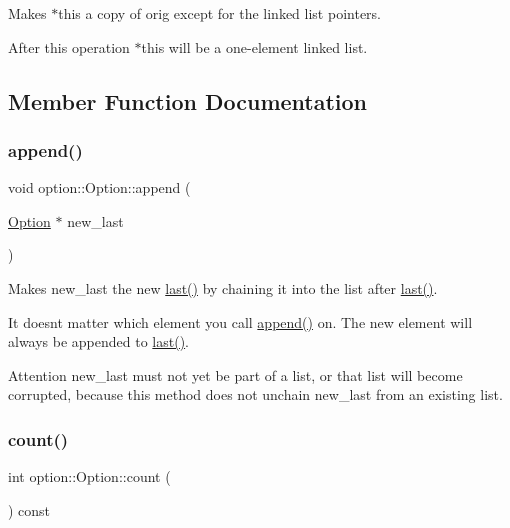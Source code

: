 Makes {\ttfamily $\ast$this} a copy of {\ttfamily orig} except for the linked list pointers. 

After this operation {\ttfamily $\ast$this} will be a one-\/element linked list. 

\subsection{Member Function Documentation}
\mbox{\label{classoption_1_1_option_a59030822a1ec4e667e6c288d7e5ec961}} 
\subsubsection{\texorpdfstring{append()}{append()}}
{\footnotesize\ttfamily void option\+::\+Option\+::append (\begin{DoxyParamCaption}\item[{\hyperlink{classoption_1_1_option}{Option} $\ast$}]{new\+\_\+last }\end{DoxyParamCaption})\hspace{0.3cm}{\ttfamily [inline]}}



Makes {\ttfamily new\+\_\+last} the new \hyperlink{classoption_1_1_option_afe2aff68191e55b59c53fac3dbbcd7c3}{last()} by chaining it into the list after \hyperlink{classoption_1_1_option_afe2aff68191e55b59c53fac3dbbcd7c3}{last()}. 

It doesn\textquotesingle{}t matter which element you call \hyperlink{classoption_1_1_option_a59030822a1ec4e667e6c288d7e5ec961}{append()} on. The new element will always be appended to \hyperlink{classoption_1_1_option_afe2aff68191e55b59c53fac3dbbcd7c3}{last()}.

\begin{DoxyAttention}{Attention}
{\ttfamily new\+\_\+last} must not yet be part of a list, or that list will become corrupted, because this method does not unchain {\ttfamily new\+\_\+last} from an existing list. 
\end{DoxyAttention}
\mbox{\label{classoption_1_1_option_ad26a118ffebde656fd82c06709086bed}} 
\subsubsection{\texorpdfstring{count()}{count()}}
{\footnotesize\ttfamily int option\+::\+Option\+::count (\begin{DoxyParamCaption}{ }\end{DoxyParamCaption}) const\hspace{0.3cm}{\ttfamily [inline]}}



